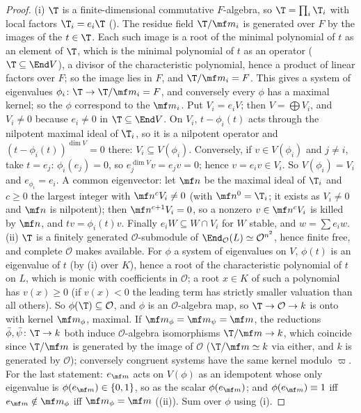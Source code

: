 \begin{proof}
(i) $\T$ is a finite-dimensional commutative $F$-algebra, so $\T=\prod_i\T_i$ with local factors $\T_i=e_i\T$ (). The residue
field $\T/\mf m_i$ is generated over $F$ by the images of the $t\in\T$. Each such image is a root of the minimal polynomial of $t$ as an element of $\T$, which is the
minimal polynomial of $t$ as an operator ($\T\subseteq\End V$), a divisor of the characteristic polynomial, hence a product of linear factors over $F$; so the
image lies in $F$, and $\T/\mf m_i=F$. This gives a system of eigenvalues $\phi_i\colon\T\to\T/\mf m_i=F$, and conversely every $\phi$ has a maximal kernel; so the
$\phi$ correspond to the $\mf m_i$. Put $V_i=e_iV$; then $V=\bigoplus V_i$, and $V_i\ne0$ because $e_i\ne0$ in $\T\subseteq\End V$. On $V_i$, $t-\phi_i(t)$ acts through
the nilpotent maximal ideal of $\T_i$, so it is a nilpotent operator and $(t-\phi_i(t))^{\dim V}=0$ there: $V_i\subseteq V(\phi_i)$. Conversely, if $v\in V(\phi_i)$ and
$j\ne i$, take $t=e_j$: $\phi_i(e_j)=0$, so $e_j^{\dim V}v=e_jv=0$; hence $v=e_iv\in V_i$. So $V(\phi_i)=V_i$ and $e_{\phi_i}=e_i$. A common eigenvector: let $\mf n$ be the
maximal ideal of $\T_i$ and $c\ge0$ the largest integer with $\mf n^cV_i\ne0$ (with $\mf n^0=\T_i$; it exists as $V_i\ne0$ and $\mf n$ is nilpotent); then
$\mf n^{c+1}V_i=0$, so a nonzero $v\in\mf n^cV_i$ is killed by $\mf n$, and
$tv=\phi_i(t)v$. Finally $e_iW\subseteq W\cap V_i$ for $W$ stable, and $w=\sum e_iw$.
(ii) $\T$ is a finitely generated $\mathcal O$-submodule of $\End_{\mathcal O}(L)\simeq\mathcal O^{n^2}$, hence finite free, and complete $\mathcal O$ makes
 available. For $\phi$ a system of eigenvalues on $V$, $\phi(t)$ is an eigenvalue of $t$ (by (i) over $K$), hence a root of the
characteristic polynomial of $t$ on $L$, which is monic with coefficients in $\mathcal O$; a root $x\in K$ of such a polynomial has $v(x)\ge0$ (if $v(x)<0$ the
leading term has strictly smaller valuation than all others). So $\phi(\T)\subseteq\mathcal O$, and $\phi$ is an $\mathcal O$-algebra map, so $\T\to\mathcal O\to k$ is onto with kernel
$\mf m_\phi$, maximal. If $\mf m_\phi=\mf m_\psi=\mf m$, the reductions $\bar\phi,\bar\psi\colon\T\to k$ both induce $\mathcal O$-algebra isomorphisms $\T/\mf m\to k$, which coincide since
$\T/\mf m$ is generated by the image of $\mathcal O$ ($\T/\mf m\simeq k$ via either, and $k$ is generated by $\mathcal O$); conversely congruent systems have the same kernel modulo
$\varpi$. For the last statement: $e_{\mf m}$ acts on $V(\phi)$ as an idempotent whose only eigenvalue is $\phi(e_{\mf m})\in\{0,1\}$, so as the scalar $\phi(e_{\mf m})$; and
$\phi(e_{\mf m})\equiv1$ iff $e_{\mf m}\notin\mf m_\phi$ iff $\mf m_\phi=\mf m$ ((ii)). Sum over $\phi$ using (i).
\end{proof}

